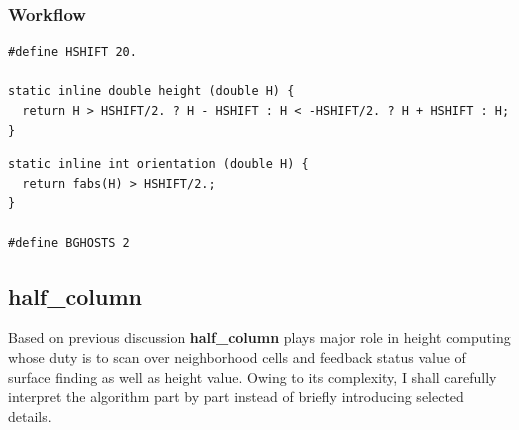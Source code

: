 \documentclass[a4paper]{article}
\newcommand{\func}[1]{\textbf{\textcolor{function}{#1}}}
\newcommand{\para}[1]{\textbf{\emph{\textcolor{para}{#1}}}}
\begin{document}
\subsubsection{Workflow}
\begin{multicols}{2}
 \columnbreak
 \begin{verbatim}
#define HSHIFT 20.

static inline double height (double H) {
  return H > HSHIFT/2. ? H - HSHIFT : H < -HSHIFT/2. ? H + HSHIFT : H;
}
 \end{verbatim}
\end{multicols}

\begin{multicols}{2}
 \columnbreak
 \begin{verbatim}
static inline int orientation (double H) {
  return fabs(H) > HSHIFT/2.;
}

#define BGHOSTS 2
 \end{verbatim}
\end{multicols}
\subsection{\func{half\_column}}
Based on previous discussion \func{half\_column} plays major role in height computing whose duty is to scan over neighborhood cells and feedback status value of surface finding as well as height value. Owing to its complexity, I shall carefully interpret the algorithm part by part instead of briefly introducing selected details.
\end{document}
